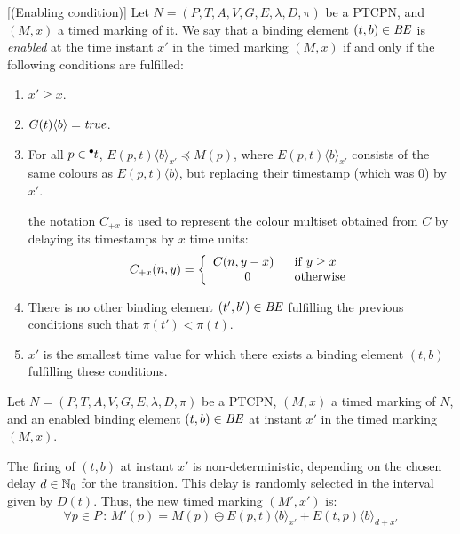 \begin{definition}\label{permitidas} [(Enabling condition)]
Let $N=(P,T,A,V,G,E,\lambda,D,\pi)$ be a PTCPN,
and $(M,x)$ a timed marking of it.
We say that a 
binding element $(t,b) \in {\it BE}$
is {\em enabled} at the time instant $x'$ in the timed marking
$(M,x)$ if and
only if the following conditions are fulfilled:

\begin{enumerate}
\item $x' \geq x$.
%
\item $G(t)\langle b \rangle = {\it true}$.
%
\item For all $p \in \hspace*{-0.4em}~^{\bullet} \hspace*{-0.05em}t$,
$E(p,t)\langle b\rangle_{x'} \preceq M(p)$, 
where 
%
$E(p,t)\langle b \rangle_{x'}$ consists of the same
colours as $E(p,t)\langle b \rangle$, but 
replacing their timestamp (which was $0$) by $x'$.
%

the notation $C_{+x}$ is used to represent the
colour multiset obtained from $C$ by delaying its timestamps
by $x$ time units:
%
\[
C_{+x}(n,y) = \left\{
\begin{array}{cl}
C(n,y-x)~~ & {\rm if}\;y \geq  x\\
0        & {\rm otherwise}
\end{array}
\right.
\]
%
\item There is no other binding element $(t',b') \in {\it BE}$
fulfilling the previous conditions  such that $\pi(t') < \pi(t)$.
%
%
\item $x'$ is the smallest time value for which there exists
a binding element $(t,b)$ fulfilling these conditions.
%
\end{enumerate}
%
\end{definition}

\begin{definition} 
Let $N=(P,T,A,V,G,E,\lambda,D,\pi)$ be a PTCPN,
$(M,x)$ a timed marking of $N$, and an enabled
binding element $(t,b) \in {\it BE}$ at 
instant $x'$ in the timed marking $(M,x)$.

The firing of $(t,b)$ at instant $x'$ is non-deterministic,
depending on the chosen delay $d \in \mathbb{N}_{0}$ for the transition.
This delay is randomly selected in the interval given by $D(t)$. 
Thus, the new timed marking $(M',x')$ is: 
%
\[
  \forall p \in P\,:\,
  M'(p) = M(p) \ominus E(p,t)\langle b \rangle_{x'} + E(t,p)\langle b
 \rangle_{d+x'}
\]
%
\end{definition}

